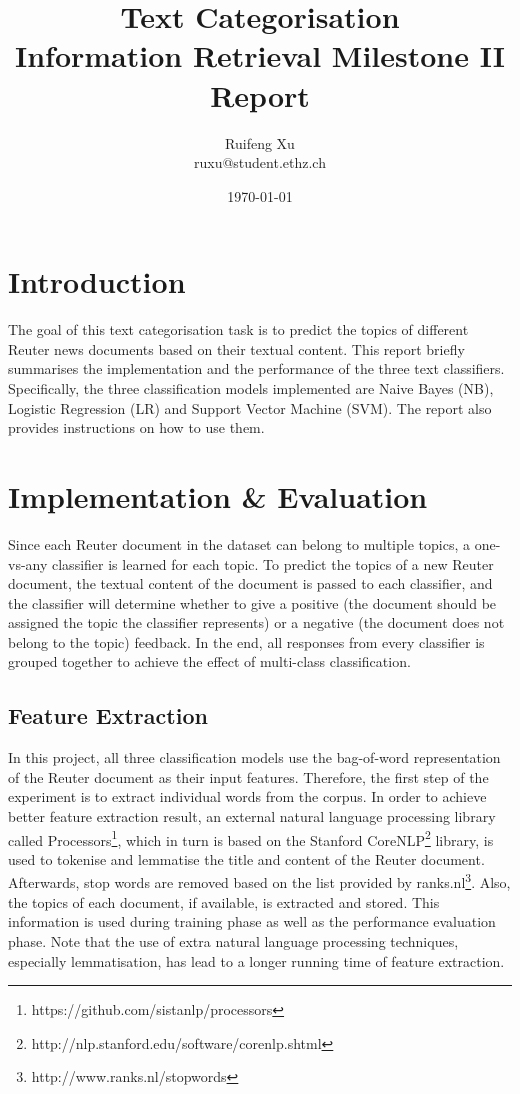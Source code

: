 \documentclass[11pt]{article}
\title{Text Categorisation \\\vspace{1mm} {\Large Information Retrieval Milestone II Report}}
\author{Ruifeng Xu\\ ruxu@student.ethz.ch\\}
\date{\today}
\begin{document}
\maketitle

\section{Introduction}
The goal of this text categorisation task is to predict the topics of different Reuter news documents based on their textual content.
This report briefly summarises the implementation and the performance of the three text classifiers. 
Specifically, the three classification models implemented are Naive Bayes (NB), Logistic Regression (LR) and Support Vector Machine (SVM).
The report also provides instructions on how to use them. 

\section{Implementation \& Evaluation}
Since each Reuter document in the dataset can belong to multiple topics, a one-vs-any classifier is learned for each topic.
To predict the topics of a new Reuter document, the textual content of the document is passed to each classifier, and the classifier will determine whether to give a positive (the document should be assigned the topic the classifier represents) or a negative (the document does not belong to the topic) feedback.
In the end, all responses from every classifier is grouped together to achieve the effect of multi-class classification.

\subsection{Feature Extraction}
In this project, all three classification models use the bag-of-word representation of the Reuter document as their input features.
Therefore, the first step of the experiment is to extract individual words from the corpus.
In order to achieve better feature extraction result, an external natural language processing library called Processors\footnote{https://github.com/sistanlp/processors}, which in turn is based on the Stanford CoreNLP\footnote{http://nlp.stanford.edu/software/corenlp.shtml} library, is used to tokenise and lemmatise the title and content of the Reuter document. 
Afterwards, stop words are removed based on the list provided by ranks.nl\footnote{http://www.ranks.nl/stopwords}.
Also, the topics of each document, if available, is extracted and stored.
This information is used during training phase as well as the performance evaluation phase. 
Note that the use of extra natural language processing techniques, especially lemmatisation, has lead to a longer running time of feature extraction.
\end{document}
